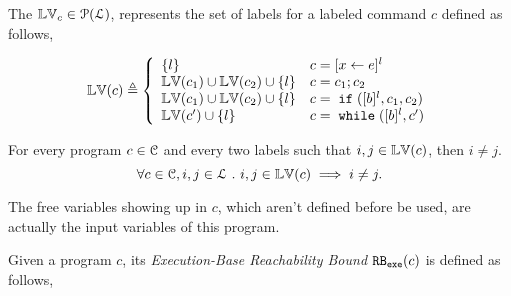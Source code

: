The $\mathbb{LV}_c \in \mathcal{P}(\mathcal{L})$,
represents the set of labels
for a labeled command $c$ defined as follows,
%
\begin{defn}
\label{def:lvar}
{\small
$$
  \lvar(c) \triangleq
  \left\{
  \begin{array}{ll}
      \{l\}                  
      & {c} = [{\assign x e}]^{l} 
      \\
      \lvar({c_1}) \cup \lvar({{c_2}})  \cup \{l\} 
      & {c} = {c_1};{c_2}
      \\
      \lvar(c_1) \cup \lvar({{c_2}}) \cup \{l\} 
      & {c} =\eif([\bexpr]^{l}, c_1, c_2) 
      \\
      \lvar({{c}'}) \cup \{l\} 
      & {c}   = \ewhile ([\bexpr]^{l}, {c}')
\end{array}
\right.
$$
}
\end{defn}
%
\begin{lem}
  \label{lem:label_unique}
  For every program $c \in \mathcal{C}$ and every two labels such that
  $i, j \in \mathbb{LV}(c)$, then $i \neq j$.
  \[
    \forall c \in \mathcal{C}, i, j \in \mathcal{L} ~.~ i, j \in \mathbb{LV}(c)\implies i \neq j.
    \]
\end{lem}
%
The free variables
showing up in $c$, which aren't defined before be used, are actually the input variables of this program.
%
\begin{defn}
  \label{def:exe_rb}
  Given a program ${c}$,
its \emph{Execution-Base Reachability Bound} 
$\mathtt{RB_{exe}}({c})$ is defined as follows,
%
\highlight{
\[
\begin{array}{l}
  \exeRB({c}) \triangleq
  \Big\{ 
  (l, w) 
  ~ \vert ~ 
  w : \mathcal{T} \to \mathbb{N}
  \land
  l \in \lvar(c) 
  \\ \qquad \qquad \qquad \qquad
  \land
  \forall \trace_0 \in \mathcal{T}_0(c), \trace \in \mathcal{T} \st
  \config{{c}, \trace} \to^{*} \config{\eskip, \trace_0 \tracecat \vtrace} 
  \implies w(\trace_0) = \vcounter(\vtrace, l) 
\Big\}
\end{array}
\]
}
\end{defn}
